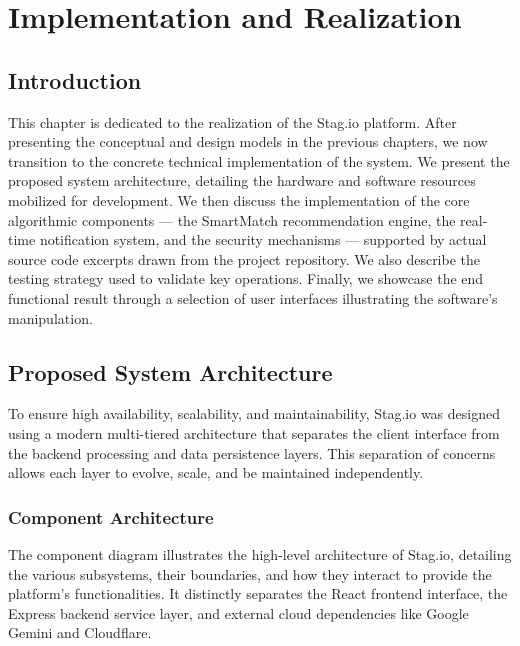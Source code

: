 
\chapter{Implementation and Realization}

\section{Introduction}

This chapter is dedicated to the realization of the Stag.io platform. After presenting the conceptual and design models in the previous chapters, we now transition to the concrete technical implementation of the system. We present the proposed system architecture, detailing the hardware and software resources mobilized for development. We then discuss the implementation of the core algorithmic components --- the SmartMatch recommendation engine, the real-time notification system, and the security mechanisms --- supported by actual source code excerpts drawn from the project repository. We also describe the testing strategy used to validate key operations. Finally, we showcase the end functional result through a selection of user interfaces illustrating the software's manipulation.

\section{Proposed System Architecture}

To ensure high availability, scalability, and maintainability, Stag.io was designed using a modern multi-tiered architecture that separates the client interface from the backend processing and data persistence layers. This separation of concerns allows each layer to evolve, scale, and be maintained independently.

\subsection{Component Architecture}

The component diagram illustrates the high-level architecture of Stag.io, detailing the various subsystems, their boundaries, and how they interact to provide the platform's functionalities. It distinctly separates the React frontend interface, the Express backend service layer, and external cloud dependencies like Google Gemini and Cloudflare.

